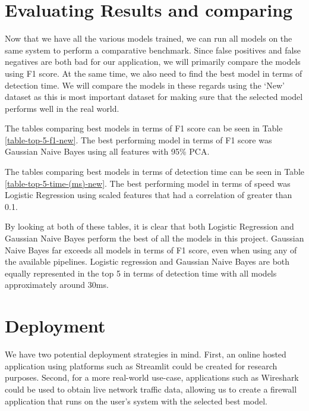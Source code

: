 \section{Evaluating Results and comparing}

Now that we have all the various models trained, we can run all models on the same system to perform a comparative benchmark. Since false positives and false negatives are both bad for our application, we will primarily compare the models using F1 score. At the same time, we also need to find the best model in terms of detection time. We will compare the models in these regards using the `New' dataset as this is most important dataset for making sure that the selected model performs well in the real world.

The tables comparing best models in terms of F1 score can be seen in Table \ref{table-top-5-f1-new}. The best performing model in terms of F1 score was Gaussian Naive Bayes using all features with 95\% PCA.



The tables comparing best models in terms of detection time can be seen in Table \ref{table-top-5-time-(ms)-new}. The best performing model in terms of speed was Logistic Regression using scaled features that had a correlation of greater than 0.1.



By looking at both of these tables, it is clear that both Logistic Regression and Gaussian Naive Bayes perform the best of all the models in this project. Gaussian Naive Bayes far exceeds all models in terms of F1 score, even when using any of the available pipelines. Logistic regression and Gaussian Naive Bayes are both equally represented in the top 5 in terms of detection time with all models approximately around 30ms.


\section{Deployment}
We have two potential deployment strategies in mind. First, an online hosted application using platforms such as Streamlit could be created for research purposes. Second, for a more real-world use-case, applications such as Wireshark could be used to obtain live network traffic data, allowing us to create a firewall application that runs on the user's system with the selected best model.

